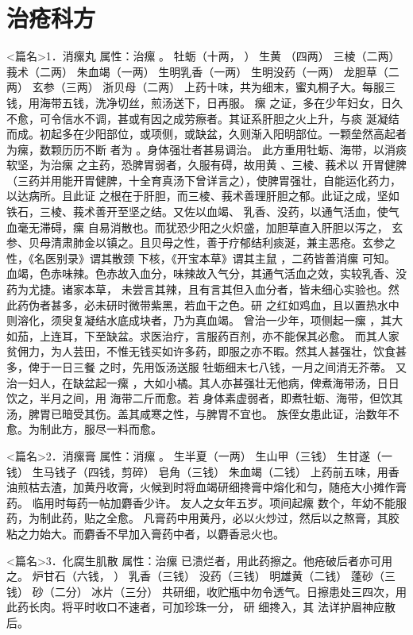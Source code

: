 \documentclass[a4paper,12pt,UTF8,twoside]{ctexbook}
\begin{document}
\chapter{治疮科方}
<篇名>1．消瘰丸
属性：治瘰 。 
牡蛎（十两， ） 生黄 （四两） 三棱（二两） 莪术（二两） 朱血竭（一两） 生明乳香（一两） 
生明没药（一两） 龙胆草（二两） 玄参（三两） 浙贝母（二两） 
上药十味，共为细末，蜜丸桐子大。每服三钱，用海带五钱，洗净切丝，煎汤送下，日再服。 
瘰 之证，多在少年妇女，日久不愈，可令信水不调，甚或有因之成劳瘵者。其证系肝胆之火上升，与痰 
涎凝结而成。初起多在少阳部位，或项侧，或缺盆，久则渐入阳明部位。一颗垒然高起者为瘰，数颗历历不断 
者为 。身体强壮者甚易调治。 
此方重用牡蛎、海带，以消痰软坚，为治瘰 之主药，恐脾胃弱者，久服有碍，故用黄 、三棱、莪术以 
开胃健脾（三药并用能开胃健脾，十全育真汤下曾详言之），使脾胃强壮，自能运化药力，以达病所。且此证 
之根在于肝胆，而三棱、莪术善理肝胆之郁。此证之成，坚如铁石，三棱、莪术善开至坚之结。又佐以血竭、 
乳香、没药，以通气活血，使气血毫无滞碍，瘰 自易消散也。而犹恐少阳之火炽盛，加胆草直入肝胆以泻之， 
玄参、贝母清肃肺金以镇之。且贝母之性，善于疗郁结利痰涎，兼主恶疮。玄参之性，《名医别录》谓其散颈 
下核，《开宝本草》谓其主鼠 ，二药皆善消瘰 可知。 
血竭，色赤味辣。色赤故入血分，味辣故入气分，其通气活血之效，实较乳香、没药为尤捷。诸家本草， 
未尝言其辣，且有言其但入血分者，皆未细心实验也。然此药伪者甚多，必未研时微带紫黑，若血干之色。研 
之红如鸡血，且以置热水中则溶化，须臾复凝结水底成块者，乃为真血竭。 
曾治一少年，项侧起一瘰 ，其大如茄，上连耳，下至缺盆。求医治疗，言服药百剂，亦不能保其必愈。 
而其人家贫佣力，为人芸田，不惟无钱买如许多药，即服之亦不暇。然其人甚强壮，饮食甚多，俾于一日三餐 
之时，先用饭汤送服 牡蛎细末七八钱，一月之间消无芥蒂。 
又治一妇人，在缺盆起一瘰 ，大如小橘。其人亦甚强壮无他病，俾煮海带汤，日日饮之，半月之间，用 
海带二斤而愈。若 
身体素虚弱者，即煮牡蛎、海带，但饮其汤，脾胃已暗受其伤。盖其咸寒之性，与脾胃不宜也。 
族侄女患此证，治数年不愈。为制此方，服尽一料而愈。 


<篇名>2．消瘰膏
属性：消瘰 。 
生半夏（一两） 生山甲（三钱） 生甘遂（一钱） 生马钱子（四钱，剪碎） 皂角（三钱） 朱血竭（二钱） 
上药前五味，用香油煎枯去渣，加黄丹收膏，火候到时将血竭研细搀膏中熔化和匀，随疮大小摊作膏药。 
临用时每药一帖加麝香少许。 
友人之女年五岁。项间起瘰 数个，年幼不能服药，为制此药，贴之全愈。 
凡膏药中用黄丹，必以火炒过，然后以之熬膏，其胶粘之力始大。而麝香不早加入膏药中者，以麝香忌火也。 


<篇名>3．化腐生肌散
属性：治瘰 已溃烂者，用此药擦之。他疮破后者亦可用之。 
炉甘石（六钱， ） 乳香（三钱） 没药（三钱） 明雄黄（二钱） 蓬砂（三钱） 砂（二分） 冰片（三分） 
共研细，收贮瓶中勿令透气。日擦患处三四次，用此药长肉。将平时收口不速者，可加珍珠一分， 研 
细搀入，其 法详护眉神应散后。 
\end{document}
